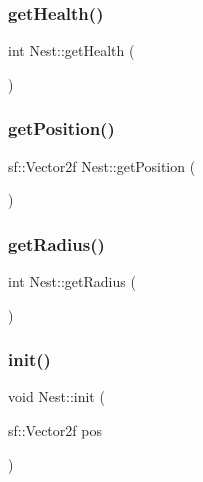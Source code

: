 \subsubsection{\texorpdfstring{get\+Health()}{getHealth()}}
{\footnotesize\ttfamily int Nest\+::get\+Health (\begin{DoxyParamCaption}{ }\end{DoxyParamCaption})}

\mbox{\label{class_nest_a3904c58d1826997b98bdfd8b357ba6fa}} 
\subsubsection{\texorpdfstring{get\+Position()}{getPosition()}}
{\footnotesize\ttfamily sf\+::\+Vector2f Nest\+::get\+Position (\begin{DoxyParamCaption}{ }\end{DoxyParamCaption})}

\mbox{\label{class_nest_a83653533eadad995b464a8a068257fe8}} 
\subsubsection{\texorpdfstring{get\+Radius()}{getRadius()}}
{\footnotesize\ttfamily int Nest\+::get\+Radius (\begin{DoxyParamCaption}{ }\end{DoxyParamCaption})}

\mbox{\label{class_nest_a1b243050144c8b5200bd3e8a4370565a}} 
\subsubsection{\texorpdfstring{init()}{init()}}
{\footnotesize\ttfamily void Nest\+::init (\begin{DoxyParamCaption}\item[{sf\+::\+Vector2f}]{pos }\end{DoxyParamCaption})}

\mbox{\label{class_nest_a3f0d0175e349409ef2cab7e9bae0fb81}} 
